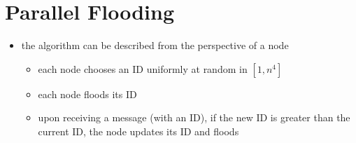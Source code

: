 \section{Parallel Flooding}
\begin{frame}
    \begin{itemize}
        \item the algorithm can be described from the perspective of a node
              \begin{itemize}
                  \item each node chooses an ID uniformly at random in $[1, n^4]$
                  \item each node floods its ID
                  \item upon receiving a message (with an ID), if the new ID is
                        greater than the current ID, the node updates its ID and
                        floods
              \end{itemize}
    \end{itemize}
\end{frame}


